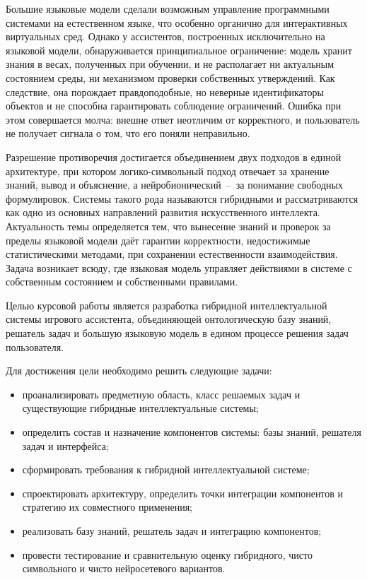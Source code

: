 
Большие языковые модели сделали возможным управление программными системами на
естественном языке, что особенно органично для интерактивных виртуальных сред.
Однако у ассистентов, построенных исключительно на языковой модели, обнаруживается
принципиальное ограничение: модель хранит знания в весах, полученных при обучении,
и не располагает ни актуальным состоянием среды, ни механизмом проверки собственных
утверждений. Как следствие, она порождает правдоподобные, но неверные
идентификаторы объектов и не способна гарантировать соблюдение ограничений. Ошибка
при этом совершается молча: внешне ответ неотличим от корректного, и пользователь
не получает сигнала о том, что его поняли неправильно\cite{Ji2023}.

Разрешение противоречия достигается объединением двух подходов в единой архитектуре,
при котором логико-символьный подход отвечает за хранение знаний, вывод и объяснение,
а нейробионический~--~за понимание свободных формулировок. Системы такого рода
называются гибридными и рассматриваются как одно из основных
направлений развития искусственного интеллекта. Актуальность темы определяется тем,
что вынесение знаний и проверок за пределы языковой модели даёт гарантии корректности,
недостижимые статистическими методами, при сохранении естественности взаимодействия.
Задача возникает всюду, где языковая модель управляет действиями в системе с
собственным состоянием и собственными правилами\cite{Garcez2023}.

Целью курсовой работы является разработка гибридной интеллектуальной системы
игрового ассистента, объединяющей онтологическую базу знаний, решатель задач и
большую языковую модель в едином процессе решения задач пользователя.

Для достижения цели необходимо решить следующие задачи:

\begin{itemize}
  \item проанализировать предметную область, класс решаемых задач и существующие
        гибридные интеллектуальные системы;
  \item определить состав и назначение компонентов системы: базы знаний, решателя
        задач и интерфейса;
  \item сформировать требования к гибридной интеллектуальной системе;
  \item спроектировать архитектуру, определить точки интеграции компонентов и
        стратегию их совместного применения;
  \item реализовать базу знаний, решатель задач и интеграцию компонентов;
  \item провести тестирование и сравнительную оценку гибридного, чисто символьного
        и чисто нейросетевого вариантов.
\end{itemize}

